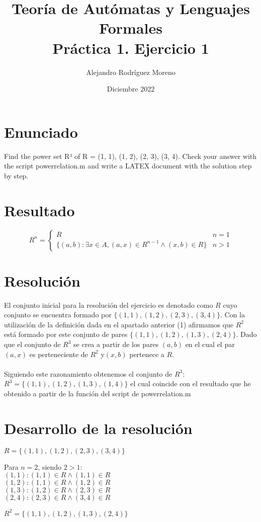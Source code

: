\documentclass{article}
\title{Teoría de Autómatas y Lenguajes Formales\\[.4\baselineskip]Práctica 1. Ejercicio 1}
\author{Alejandro Rodríguez Moreno}
\date{Diciembre 2022}
\begin{document}
\maketitle{}

\section*{Enunciado}
Find the power set R³ of R = {(1, 1), (1, 2), (2, 3), (3, 4)}. Check your answer with the script powerrelation.m and write a LATEX document with the
solution step by step.
\\
\section*{Resultado}
\begin{equation}
R^n =
    \begin{cases}
   
            R & n = 1
          \\  \{(a,b) : \exists x \in A, (a,x) \in R^{n-1} \wedge (x,b) \in R\} & n > 1
           
   
    \end{cases}
\end{equation}

\section*{Resolución}
El conjunto inicial para la resolución del ejercicio es denotado como $R$ cuyo conjunto se encuentra formado por $\lbrace{(1, 1),(1, 2),(2, 3),(3, 4)}\rbrace$. Con la utilización de la definición dada en el apartado anterior (1) afirmamos que $R^2$ está formado por este conjunto de pares $\lbrace{(1, 1),(1, 2),(1, 3),(2, 4)}\rbrace$. Dado que el conjunto de $R^3$ se crea a partir de los pares $(a,b)$ en el cual el par $(a,x)$ es perteneciente de $R^2$  y$(x,b)$ pertenece a $R $.
\\
\\
Siguiendo este razonamiento obtenemos el conjunto de $R^3$: $R^3 = \lbrace{(1,1),(1,2),(1,3),(1,4)}\rbrace$ el cual coincide con el resultado que he obtenido a partir de la función del script de powerrelation.m

\section*{Desarrollo de la resolución}
$R =\lbrace{(1, 1),(1, 2),(2, 3),(3, 4)}\rbrace$
\begin{center}
Para $n = 2$, siendo $2 > 1$:
\\
$(1,1) : (1,1) \in R \wedge (1,1) \in R$
\\$(1,2) : (1,1) \in R \wedge (1,2) \in R$
\\$(1,3) : (1,2) \in R \wedge (2,3) \in R$
\\$(2,4) : (2,3) \in R \wedge (3,4) \in R$
\end{center}
$R^2 = \lbrace{(1, 1),(1, 2),(1, 3),(2, 4)}\rbrace$
\\
\end{document}
